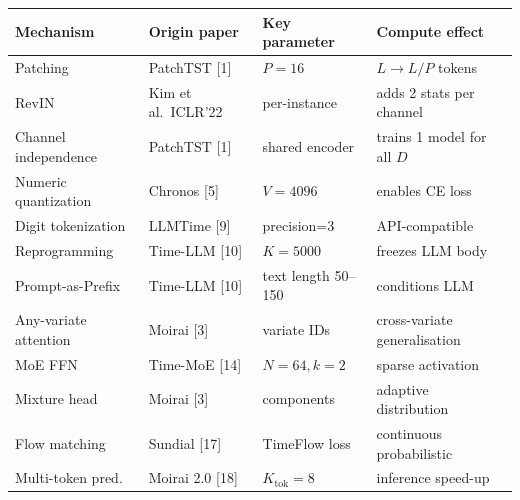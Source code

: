 {\def\LTcaptype{none} %
\begin{longtable}[]{@{}
  >{\raggedright\arraybackslash}p{}
  >{\raggedright\arraybackslash}p{}
  >{\raggedright\arraybackslash}p{}
  >{\raggedright\arraybackslash}p{}@{}}
\toprule\noalign{}
\begin{minipage}[b]{\linewidth}\raggedright
Mechanism
\end{minipage} & \begin{minipage}[b]{\linewidth}\raggedright
Origin paper
\end{minipage} & \begin{minipage}[b]{\linewidth}\raggedright
Key parameter
\end{minipage} & \begin{minipage}[b]{\linewidth}\raggedright
Compute effect
\end{minipage} \\
\midrule\noalign{}
\endhead
\bottomrule\noalign{}
\endlastfoot
Patching & PatchTST {[}1{]} & \(P=16\) & \(L \to L/P\) tokens \\
RevIN & Kim et al.~ICLR'22 & per-instance & adds 2 stats per channel \\
Channel independence & PatchTST {[}1{]} & shared encoder & trains 1 model for all \(D\) \\
Numeric quantization & Chronos {[}5{]} & \(V=4096\) & enables CE loss \\
Digit tokenization & LLMTime {[}9{]} & precision=3 & API-compatible \\
Reprogramming & Time-LLM {[}10{]} & \(K=5000\) & freezes LLM body \\
Prompt-as-Prefix & Time-LLM {[}10{]} & text length 50--150 & conditions LLM \\
Any-variate attention & Moirai {[}3{]} & variate IDs & cross-variate generalisation \\
MoE FFN & Time-MoE {[}14{]} & \(N=64, k=2\) & sparse activation \\
Mixture head & Moirai {[}3{]} & 3 components & adaptive distribution \\
Flow matching & Sundial {[}17{]} & TimeFlow loss & continuous probabilistic \\
Multi-token pred. & Moirai 2.0 {[}18{]} & \(K_{\mathrm{tok}}=8\) & inference speed-up \\
\end{longtable}
}

